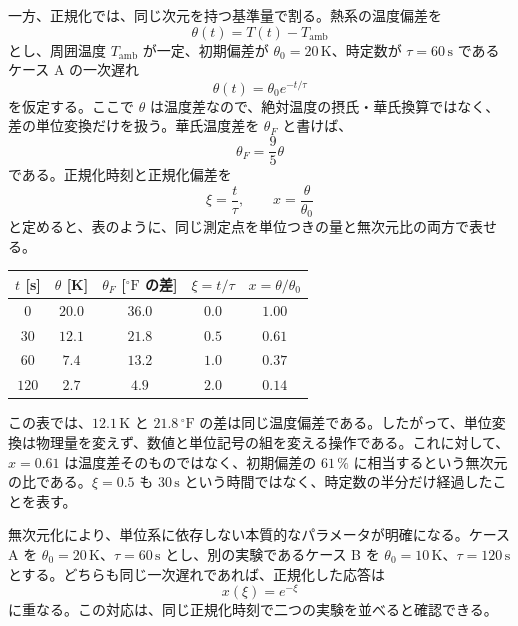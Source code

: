 一方、正規化では、同じ次元を持つ基準量で割る。熱系の温度偏差を
\begin{equation}
  \theta(t)=T(t)-T_{\mathrm{amb}}
\end{equation}
とし、周囲温度 $T_{\mathrm{amb}}$ が一定、初期偏差が $\theta_0=20\,\mathrm{K}$、時定数が $\tau=60\,\mathrm{s}$ であるケース A の一次遅れ
\begin{equation}
  \theta(t)=\theta_0 e^{-t/\tau}
\end{equation}
を仮定する。ここで $\theta$ は温度差なので、絶対温度の摂氏・華氏換算ではなく、差の単位変換だけを扱う。華氏温度差を $\theta_F$ と書けば、
\begin{equation}
  \theta_F=\frac{9}{5}\theta
\end{equation}
である。正規化時刻と正規化偏差を
\begin{equation}
  \xi=\frac{t}{\tau},\qquad
  x=\frac{\theta}{\theta_0}
\end{equation}
と定めると、表のように、同じ測定点を単位つきの量と無次元比の両方で表せる。

\begin{center}
\small
\begin{tabular}{c|c|c|c|c}
$t$ [s] & $\theta$ [K] & $\theta_F$ [$^\circ\mathrm{F}$ の差] & $\xi=t/\tau$ & $x=\theta/\theta_0$ \\
\hline
$0$ & $20.0$ & $36.0$ & $0.0$ & $1.00$ \\
$30$ & $12.1$ & $21.8$ & $0.5$ & $0.61$ \\
$60$ & $7.4$ & $13.2$ & $1.0$ & $0.37$ \\
$120$ & $2.7$ & $4.9$ & $2.0$ & $0.14$
\end{tabular}
\end{center}

この表では、$12.1\,\mathrm{K}$ と $21.8\,^\circ\mathrm{F}$ の差は同じ温度偏差である。したがって、単位変換は物理量を変えず、数値と単位記号の組を変える操作である。これに対して、$x=0.61$ は温度差そのものではなく、初期偏差の $61\,\%$ に相当するという無次元の比である。$\xi=0.5$ も $30\,\mathrm{s}$ という時間ではなく、時定数の半分だけ経過したことを表す。

無次元化により、単位系に依存しない本質的なパラメータが明確になる。ケース A を $\theta_0=20\,\mathrm{K}$、$\tau=60\,\mathrm{s}$ とし、別の実験であるケース B を $\theta_0=10\,\mathrm{K}$、$\tau=120\,\mathrm{s}$ とする。どちらも同じ一次遅れであれば、正規化した応答は
\begin{equation}
  x(\xi)=e^{-\xi}
\end{equation}
に重なる。この対応は、同じ正規化時刻で二つの実験を並べると確認できる。

